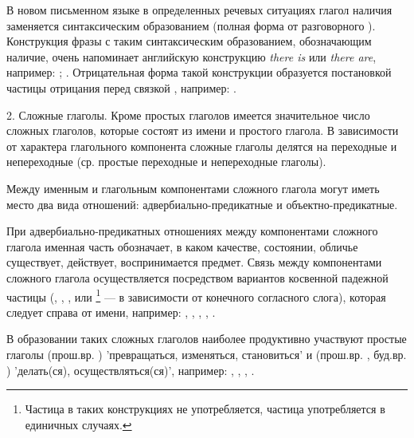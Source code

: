 В новом письменном языке в определенных речевых ситуациях глагол наличия  заменяется синтаксическим образованием  (полная форма от разговорного ). Конструкция фразы с таким синтаксическим образованием, обозначающим наличие, очень напоминает английскую конструкцию \emph{there is} или \emph{there are}, например:
;
.
Отрицательная форма такой конструкции образуется постановкой частицы отрицания перед связкой , например:
.

2. Сложные глаголы. Кроме простых глаголов имеется значительное число сложных глаголов, которые состоят из имени и простого глагола. В зависимости от характера глагольного компонента сложные глаголы делятся на переходные и непереходные (ср. простые переходные и непереходные глаголы).

Между именным и глагольным компонентами сложного глагола могут иметь место два вида отношений: адвербиально-предикатные и объектно-предикатные.

При адвербиально-предикатных отношениях между компонентами сложного глагола именная часть обозначает, в каком качестве, состоянии, обличье существует, действует, воспринимается предмет. Связь между компонентами сложного глагола осуществляется посредством вариантов косвенной падежной частицы (, , ,  или \footnote[35]{Частица  в таких конструкциях не употребляется, частица  употребляется в единичных случаях.} --- в зависимости от конечного согласного слога), которая следует справа от имени, например:
,
,
,
,
.

В образовании таких сложных глаголов наиболее продуктивно участвуют простые глаголы	 (прош.вр. ) 'превращаться, изменяться, становиться' и (прош.вр. , буд.вр. ) 'делать(ся), осуществляться(ся)', например:
,
,
,
.

